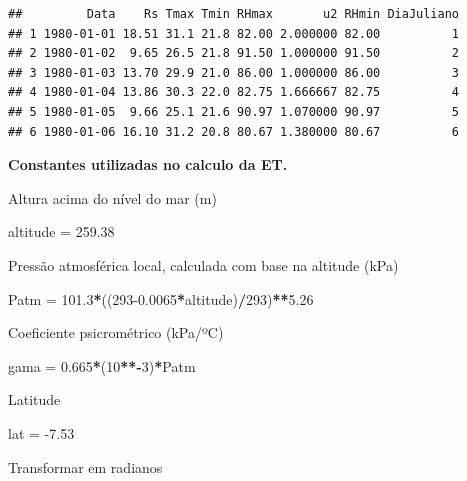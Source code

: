 \documentclass[
]{book}
\newenvironment{Shaded}{\begin{snugshade}}{\end{snugshade}}
\newcommand{\DecValTok}[1]{\textcolor[rgb]{0.00,0.00,0.81}{#1}}
\newcommand{\FloatTok}[1]{\textcolor[rgb]{0.00,0.00,0.81}{#1}}
\newcommand{\NormalTok}[1]{#1}
\newcommand{\OperatorTok}[1]{\textcolor[rgb]{0.81,0.36,0.00}{\textbf{#1}}}
\newcommand{\StringTok}[1]{\textcolor[rgb]{0.31,0.60,0.02}{#1}}
\begin{document}
\begin{verbatim}
##         Data    Rs Tmax Tmin RHmax       u2 RHmin DiaJuliano
## 1 1980-01-01 18.51 31.1 21.8 82.00 2.000000 82.00          1
## 2 1980-01-02  9.65 26.5 21.8 91.50 1.000000 91.50          2
## 3 1980-01-03 13.70 29.9 21.0 86.00 1.000000 86.00          3
## 4 1980-01-04 13.86 30.3 22.0 82.75 1.666667 82.75          4
## 5 1980-01-05  9.66 25.1 21.6 90.97 1.070000 90.97          5
## 6 1980-01-06 16.10 31.2 20.8 80.67 1.380000 80.67          6
\end{verbatim}

\textbf{Constantes utilizadas no calculo da ET.}

Altura acima do nível do mar (m)

\begin{Shaded}
\begin{Highlighting}[]
\NormalTok{altitude =}\StringTok{ }\FloatTok{259.38} 
\end{Highlighting}
\end{Shaded}

Pressão atmosférica local, calculada com base na altitude (kPa)

\begin{Shaded}
\begin{Highlighting}[]
\NormalTok{Patm =}\StringTok{ }\FloatTok{101.3}\OperatorTok{*}\NormalTok{((}\DecValTok{293}\FloatTok{-0.0065}\OperatorTok{*}\NormalTok{altitude)}\OperatorTok{/}\DecValTok{293}\NormalTok{)}\OperatorTok{**}\FloatTok{5.26} 
\end{Highlighting}
\end{Shaded}

Coeficiente psicrométrico (kPa/ºC)

\begin{Shaded}
\begin{Highlighting}[]
\NormalTok{gama =}\StringTok{ }\FloatTok{0.665}\OperatorTok{*}\NormalTok{(}\DecValTok{10}\OperatorTok{**-}\DecValTok{3}\NormalTok{)}\OperatorTok{*}\NormalTok{Patm }
\end{Highlighting}
\end{Shaded}

Latitude

\begin{Shaded}
\begin{Highlighting}[]
\NormalTok{lat =}\StringTok{ }\FloatTok{-7.53}  
\end{Highlighting}
\end{Shaded}

Transformar em radianos
\end{document}

